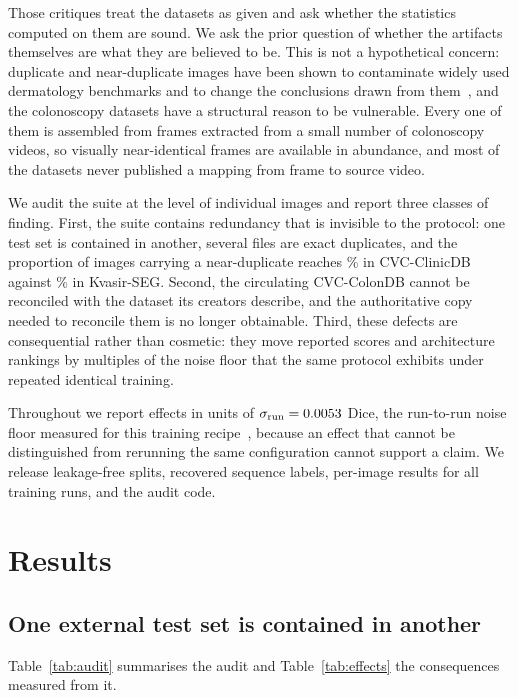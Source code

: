\documentclass[11pt]{article}
\begin{document}
Those critiques treat the datasets as given and ask whether the statistics
computed on them are sound. We ask the prior question of whether the artifacts
themselves are what they are believed to be. This is not a hypothetical
concern: duplicate and near-duplicate images have been shown to contaminate
widely used dermatology benchmarks and to change the conclusions drawn from
them~\citep{cassidy2022isic,groger2023dermatology}, and the colonoscopy
datasets have a structural reason to be vulnerable. Every one of them is
assembled from frames extracted from a small number of colonoscopy videos, so
visually near-identical frames are available in abundance, and most of the
datasets never published a mapping from frame to source video.

We audit the suite at the level of individual images and report three classes
of finding. First, the suite contains redundancy that is invisible to the
protocol: one test set is contained in another, several files are exact
duplicates, and the proportion of images carrying a near-duplicate reaches
\NearDupNinetyClinic\% in CVC-ClinicDB against
\NearDupNinetyKvasir\% in Kvasir-SEG. Second, the circulating CVC-ColonDB
cannot be reconciled with the dataset its creators describe, and the
authoritative copy needed to reconcile them is no longer obtainable. Third,
these defects are consequential rather than cosmetic: they move reported
scores and architecture rankings by multiples of the noise floor that the same
protocol exhibits under repeated identical training.

Throughout we report effects in units of $\sigma_{\mathrm{run}} =
0.0053{}$ Dice, the run-to-run noise floor measured for this training
recipe~\citep{puri2026what,puri2026data}, because an effect that cannot be
distinguished from rerunning the same configuration cannot support a claim. We release
leakage-free splits, recovered sequence labels, per-image results for all
\NRuns{} training runs, and the audit code.

\section*{Results}

\subsection*{One external test set is contained in another}

Table~\ref{tab:audit} summarises the audit and Table~\ref{tab:effects} the
consequences measured from it.
\end{document}

